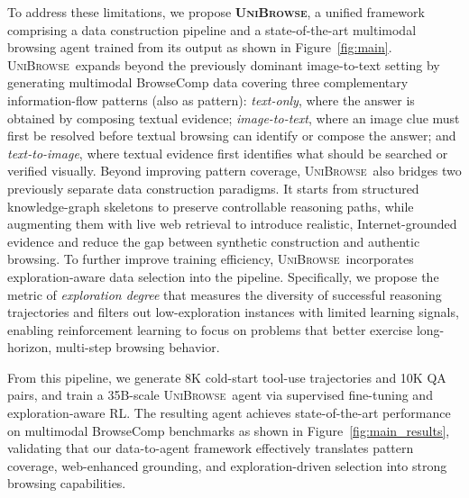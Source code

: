\documentclass[11pt]{article}
\newcommand{\modelname}{\textsc{UniBrowse}}
\begin{document}
To address these limitations, we propose \textbf{\modelname}, a unified framework comprising a data construction pipeline and a state-of-the-art multimodal browsing agent trained from its output as shown in Figure~\ref{fig:main}. 
\modelname\ expands beyond the previously dominant image-to-text setting by generating multimodal BrowseComp data covering three complementary information-flow patterns (also as pattern): \emph{text-only}, where the answer is obtained by composing textual evidence; \emph{image-to-text}, where an image clue must first be resolved before textual browsing can identify or compose the answer; and \emph{text-to-image}, where textual evidence first identifies what should be searched or verified visually.
Beyond improving pattern coverage, \modelname\ also bridges two previously separate data construction paradigms. It starts from structured knowledge-graph skeletons to preserve controllable reasoning paths, while augmenting them with live web retrieval to introduce realistic, Internet-grounded evidence and reduce the gap between synthetic construction and authentic browsing.
To further improve training efficiency, \modelname\ incorporates exploration-aware data selection into the pipeline. Specifically, we propose the metric of \textit{exploration degree } that measures the diversity of successful reasoning trajectories and filters out low-exploration instances with limited learning signals, enabling reinforcement learning to focus on problems that better exercise long-horizon, multi-step browsing behavior.

From this pipeline, we generate 8K cold-start tool-use trajectories and 10K QA pairs, and train a 35B-scale \modelname\ agent via supervised fine-tuning and exploration-aware RL. The resulting agent achieves state-of-the-art performance on multimodal BrowseComp benchmarks as shown in Figure~\ref{fig:main_results}, validating that our data-to-agent framework effectively translates pattern coverage, web-enhanced grounding, and exploration-driven selection into strong browsing capabilities.
\end{document}
